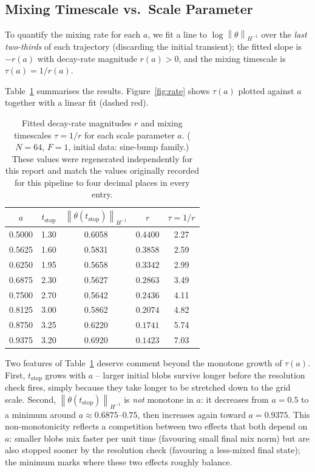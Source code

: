\documentclass[12pt,a4paper]{article}
\newcommand{\norm}[1]{\left\lVert#1\right\rVert}
\theoremstyle{definition}
\theoremstyle{plain}
\begin{document}
\subsection{Mixing Timescale vs.\ Scale Parameter}
\label{sec:rate}

To quantify the mixing rate for each $a$, we fit a line to
$\log\norm{\theta}_{H^{-1}}$ over the \emph{last two-thirds} of each
trajectory (discarding the initial transient); the fitted slope is
$-r(a)$ with decay-rate magnitude $r(a)>0$, and the mixing timescale is
$\tau(a) = 1/r(a)$.

Table~\ref{tab:rates} summarises the results.
Figure~\ref{fig:rate} shows $\tau(a)$ plotted against $a$ together with a
linear fit (dashed red).

\begin{table}[H]
  \centering
  \caption{%
    Fitted decay-rate magnitudes $r$ and mixing timescales $\tau=1/r$
    for each scale parameter $a$.
    ($N=64$, $F=1$, initial data: sine-bump family.)
    These values were regenerated independently for this report and match
    the values originally recorded for this pipeline to four decimal
    places in every entry.
  }
  \label{tab:rates}
  \begin{tabular}{ccccc}
    \toprule
    $a$ & $t_{\text{stop}}$ & $\norm{\theta(t_{\text{stop}})}_{H^{-1}}$
        & $r$ & $\tau = 1/r$ \\
    \midrule
    0.5000 & 1.30 & 0.6058 & $0.4400$ & 2.27 \\
    0.5625 & 1.60 & 0.5831 & $0.3858$ & 2.59 \\
    0.6250 & 1.95 & 0.5658 & $0.3342$ & 2.99 \\
    0.6875 & 2.30 & 0.5627 & $0.2863$ & 3.49 \\
    0.7500 & 2.70 & 0.5642 & $0.2436$ & 4.11 \\
    0.8125 & 3.00 & 0.5862 & $0.2074$ & 4.82 \\
    0.8750 & 3.25 & 0.6220 & $0.1741$ & 5.74 \\
    0.9375 & 3.20 & 0.6920 & $0.1423$ & 7.03 \\
    \bottomrule
  \end{tabular}
\end{table}

Two features of Table~\ref{tab:rates} deserve comment beyond the monotone
growth of $\tau(a)$. First, $t_{\text{stop}}$ grows with $a$ -- larger
initial blobs survive longer before the resolution check fires, simply
because they take longer to be stretched down to the grid scale. Second,
$\norm{\theta(t_{\text{stop}})}_{H^{-1}}$ is \emph{not} monotone in $a$: it
decreases from $a=0.5$ to a minimum around $a\approx0.6875$--$0.75$, then
increases again toward $a=0.9375$. This non-monotonicity reflects a
competition between two effects that both depend on $a$: smaller blobs mix
faster per unit time (favouring small final mix norm) but are also stopped
sooner by the resolution check (favouring a less-mixed final state); the
minimum marks where these two effects roughly balance.
\end{document}
